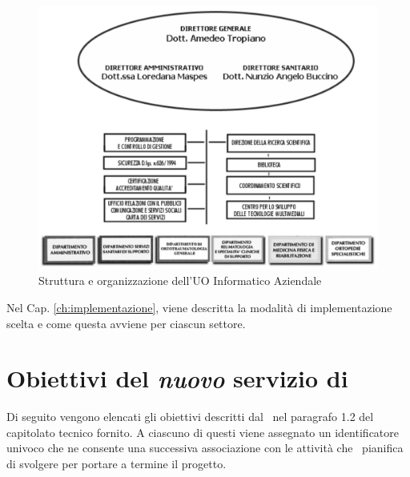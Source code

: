 		\begin{figure}[h!]
			\centering
			\includegraphics[width=\linewidth]{img/gerarchia.png}
			\caption{Struttura e organizzazione dell'UO Informatico Aziendale}
			\label{fig:gerarchia}
		\end{figure}

		Nel Cap. \ref{ch:implementazione}, viene descritta la modalità di implementazione scelta e come questa avviene per ciascun settore.
		
%
%	

\newpage
\section{Obiettivi del \textit{nuovo} servizio di \helpdesk}\label{sec:obiettivi_helpdesk}

	
	Di seguito vengono elencati gli obiettivi descritti dal \proponente~nel paragrafo 1.2 del capitolato tecnico fornito.
	A ciascuno di questi viene assegnato un identificatore univoco che ne consente una successiva associazione con le attività che \azienda~pianifica di svolgere per portare a termine il progetto.
	

